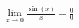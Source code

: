 \documentclass[preview]{standalone}
\begin{document}
\begin{align*}
\lim_{x \to 0} \frac{\sin(x)}{x} = \frac{0}{0}
\end{align*}
\end{document}
